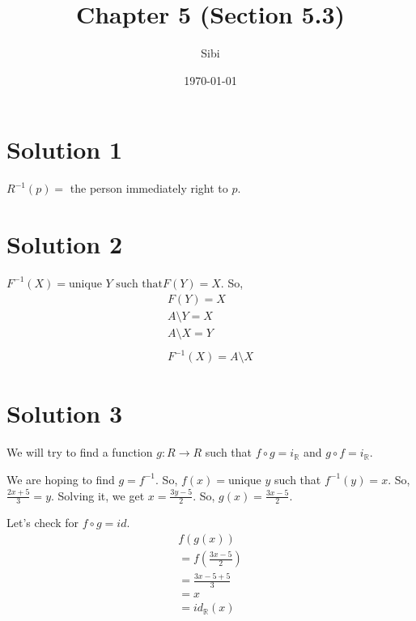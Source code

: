 \documentclass{article}
\begin{document}
\title{Chapter 5 (Section 5.3)}
\author{Sibi}
\date{\today}
\maketitle

\DeclarePairedDelimiter\abs{\lvert}{\rvert}%
\DeclarePairedDelimiter\norm{\lVert}{\rVert}%

\makeatletter
\let\oldabs\abs
\def\abs{\@ifstar{\oldabs}{\oldabs*}}
%
\let\oldnorm\norm
\def\norm{\@ifstar{\oldnorm}{\oldnorm*}}
\makeatother
\newpage

\section{Solution 1}
$R^{-1}(p) = $ the person immediately right to $p.$

\section{Solution 2}
$F^{-1}(X) = \text{unique } Y \text{ such that} F(Y) = X$.
So, \begin{align*}
      F(Y) = X \\
      A \setminus Y = X \\
      A \setminus X = Y \\ \\
      F^{-1}(X) = A \setminus X
    \end{align*}

\section{Solution 3}
We will try to find a function $g: R \to R$ such that $f \circ g =
i_\mathbb{R}$ and $g \circ f = i_\mathbb{R}$.

We are hoping to find $g = f^{-1}$. So, $f(x) = \text{unique }y$ such
that $f^{-1}(y) = x$. So, $\frac{2x + 5}{3} = y$. Solving it, we get
$x = \frac{3y-5}{2}$. So, $g(x) = \frac{3x-5}{2}$.

Let's check for $f \circ g = id$.
\begin{align*}
  f(g(x)) \\
  = f(\frac{3x-5}{2}) \\
  = \frac{3x - 5 + 5}{3} \\
  = x \\
  = id_{\mathbb{R}}(x)
\end{align*}
\end{document}
